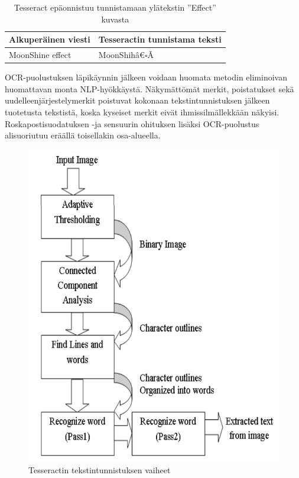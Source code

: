 \begin{table}[t]
  \begin{tabular}{| l | m{20em} |}
    \hline
    Alkuperäinen viesti & Tesseractin tunnistama teksti\\
    \hline
    MoonShine effect & MoonShih\^a€$\square$\~A\\
    \hline
  \end{tabular}
  \caption{Tesseract epäonnistuu tunnistamaan ylätekstin ''Effect'' kuvasta \citep{tesseractocr}}
\end{table}

OCR-puolustuksen läpikäynnin jälkeen voidaan huomata metodin eliminoivan huomattavan monta NLP-hyökkäystä. Näkymättömät merkit, poistatukset sekä uudelleenjärjestelymerkit poistuvat kokonaan tekstintunnistuksen jälkeen tuotetusta tekstistä, koska kyseiset merkit eivät ihmissilmällekkään näkyisi. Roskapostisuodatuksen -ja sensuurin ohituksen lisäksi OCR-puolustus alisuoriutuu eräällä toisellakin osa-alueella.

\begin{figure}[t]
  \includegraphics[scale=0.4]{figures/tesseract.png}
  \caption{Tesseractin tekstintunnistuksen vaiheet \citep{tesseractocr}}
\end{figure}



